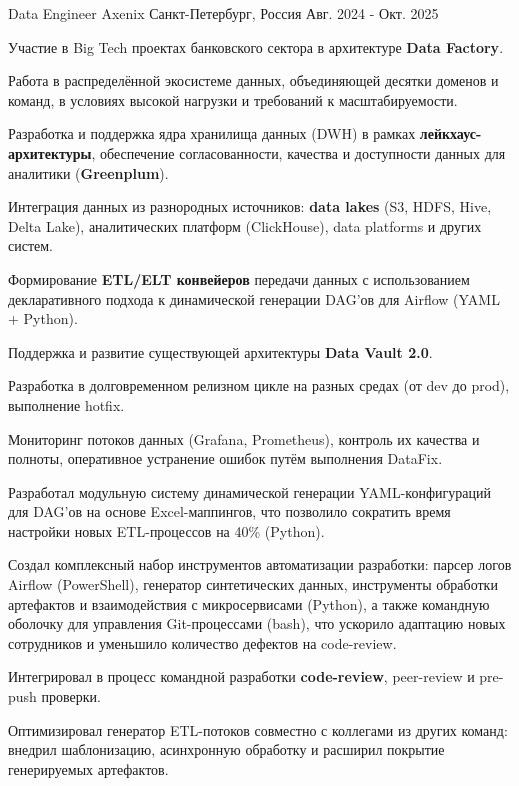 \begin{cventries}
  \cventry
    {Data Engineer} %
    {Axenix} %
    {Санкт-Петербург, Россия} %
    {Авг. 2024 - Окт. 2025} %
    {
      \begin{cvitems}
        \item {Участие в Big Tech проектах банковского сектора в архитектуре \textbf{Data Factory}.}
        \item {Работа в распределённой экосистеме данных, объединяющей десятки доменов и команд, в условиях высокой нагрузки и требований к масштабируемости.}
        \item {Разработка и поддержка ядра хранилища данных (DWH) в рамках \textbf{лейкхаус-архитектуры}, обеспечение согласованности, качества и доступности данных для аналитики (\textbf{Greenplum}).}
        \item {Интеграция данных из разнородных источников: \textbf{data lakes} (S3, HDFS, Hive, Delta Lake), аналитических платформ (ClickHouse), data platforms и других систем.}
        \item {Формирование \textbf{ETL/ELT конвейеров} передачи данных с использованием декларативного подхода к динамической генерации DAG’ов для Airflow (YAML + Python).}
        \item {Поддержка и развитие существующей архитектуры \textbf{Data Vault 2.0}.}
        \item {Разработка в долговременном релизном цикле на разных средах (от dev до prod), выполнение hotfix.}
        \item {Мониторинг потоков данных (Grafana, Prometheus), контроль их качества и полноты, оперативное устранение ошибок путём выполнения DataFix.}
        \item {Разработал модульную систему динамической генерации YAML-конфигураций для DAG’ов на основе Excel-маппингов, что позволило сократить время настройки новых ETL-процессов на 40\% (Python).}
        \item {Создал комплексный набор инструментов автоматизации разработки: парсер логов Airflow (PowerShell), генератор синтетических данных, инструменты обработки артефактов и взаимодействия с микросервисами (Python), а также командную оболочку для управления Git-процессами (bash), что ускорило адаптацию новых сотрудников и уменьшило количество дефектов на code-review.}
        \item {Интегрировал в процесс командной разработки \textbf{code-review}, peer-review и pre-push проверки.}
        \item {Оптимизировал генератор ETL-потоков совместно с коллегами из других команд: внедрил шаблонизацию, асинхронную обработку и расширил покрытие генерируемых артефактов.}

\end{cvitems}}
\end{cventries}
